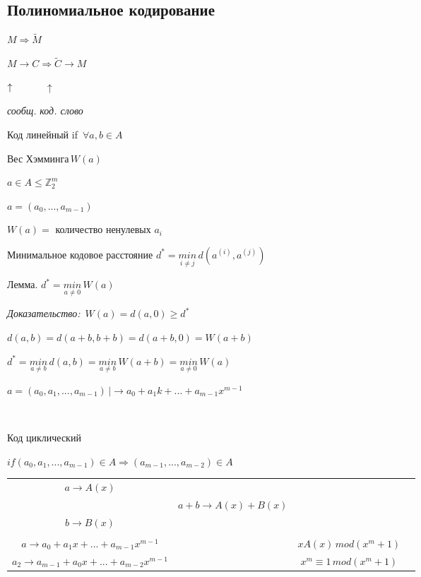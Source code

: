 \documentclass[12pt]{article}
\begin{document}
\subsection{Полиномиальное кодирование}
$M \Rightarrow \widetilde{M}$\par
$M \to C \Rightarrow \widetilde{C} \to M$\par
$\uparrow \hspace{1 cm}$ $\uparrow$\par
\textit{сообщ.} \textit{код. слово}\par
Код линейный if $\, \forall a,b \in A$\par
Вес Хэмминга$\, W(a)$\par
$a \in A \leq \mathbb{Z}_2^m$\par
$a = (a_0,...,a_{m-1})$\par
$W(a) =$ количество ненулевых $a_i$\par
Минимальное кодовое расстояние $d^* = \overset{}{\underset{i \neq j}{min}} \, d(a^{(i)},a^{(j)})$\par
Лемма. $d^* = \overset{}{\underset{a \neq 0}{min}} \, W(a)$\par
\textit{Доказательство:} $\, W(a) = d(a,0) \geq d^*$\par
$d(a,b) = d(a+b,b+b) = d(a+b, 0) = W(a+b)$\par
$d^* = \overset{}{\underset{a \neq b}{min}} \, d(a,b) = \overset{}{\underset{a \neq b}{min}} \, W(a+b) = \overset{}{\underset{a \neq 0}{min} \, W(a)}$\par
$a = (a_0, a_1, ..., a_{m-1}) \, |\to a_0+a_1k+...+a_{m-1}x^{m-1}$\par
$ $\par
Код циклический\par
$if (a_0,a_1,...,a_{m-1}) \in A \Rightarrow (a_{m-1},...,a_{m-2}) \in A$\par
\begin{tabular}{cccc}
    $a \to A(x)$                                                                                             \\
                                                     & $a+b \to A(x) + B(x)$                                 \\
    $b \to B(x)$                                                                                             \\
    \\
    $a \to a_0 +a_1 x +...+ a_{m-1}x^{m-1}$          &                       & $xA(x) \, mod(x^m + 1)$       \\
    $a_2 \to a_{m-1} + a_0 x + ... + a_{m-2}x^{m-1}$ &                       & $x^m \equiv 1 \, mod(x^m +1)$ \\
\end{tabular}\par
\end{document}
